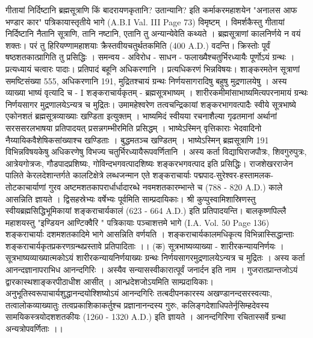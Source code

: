 गीतायां निर्दिष्टानि ब्रह्मसूत्राणि किं बादरायणकृतानि? उतान्यानि? इति कर्माकरमहाशयेन "अनालस आफ भण्डार कार" पत्रिकायास्तृतीये भागे (A.B.I Val. III Page 73) विमृष्टम् । विमर्शकैस्तु गीतायां निर्दिष्टानि नैतानि सूत्राणि, तानि नष्टानि, एतानि तु अन्यान्येवेति कथ्यते । ब्रह्मसूत्राणां कालनिर्णये न वयं शक्तः। परं तु हिरियण्णामहाशयाः क्रैस्तवीयचतुर्थतकमिति (400 A.D.) वदन्ति। क्रिस्तोः पूर्वं षष्ठशतकात्प्रागिति तु प्रसिद्धिः । 
समन्वय - अविरोध - साधन - फलाख्यैश्चतुर्भिरध्यायैः पूर्णोऽयं ग्रन्थः । प्रत्यध्यायं चत्वारः पादाः। प्रतिपादं बहूनि अधिकरणानि । प्रत्यधिकरणं भिन्नविषयः। शाङ्करमतेन सूत्राणां समष्टिसंख्या 555, अधिकरणानि 191, मुद्रितश्चायं ग्रन्थः निर्णयसागरादिषु बहुषु मुद्रणालयेषु । अस्य व्याख्या भाष्यं वृत्यादि च -  
I शङ्कराचार्यकृतम् - ब्रह्मसूत्रभाष्यम् । 
शारीरकमीमांसाभाष्यमित्यपरनामायं ग्रन्थः निर्णयसागर मुद्रणालयेऽन्यत्र च मुद्रितः। उमामहेश्वरेण तत्वचन्द्रिकायां शङ्करभागवत्पादैः स्वीये सूत्रभाष्ये एकोनशतं ब्रह्मसूत्रव्याख्याः खण्डिता इत्युक्तम् । भाष्यमिदं स्वीयया रचनाशैल्या गृढतमानां अर्थानां सरससरलभाषया प्रतिपादयत् प्रसन्नगम्भीरमिति प्रसिद्धम् । भाष्येऽस्मिन् वृत्तिकाराः भेदवादिनो नैय्यायिकवैशेषिकसांख्याश्च खण्डिताः । बुद्धमतञ्च खण्डितम् । भाष्येऽस्मिन् ब्रह्मसूत्राणि  191 विभिन्नविषयकेषु अधिकरणेषु विभज्य चतुर्भिरध्यायैरूपवर्णितानि । 
अस्य कर्ता विद्याघिराजपौत्रः, शिवगुरुपुत्रः, आत्रेयगोत्रजः, गौडपादप्रशिष्यः, गोविन्दभगवत्पादशिष्यः शङ्करभगवत्पाद इति प्रसिद्धिः। राजशेखरराजेन पालिते केरलदेशान्तर्गते कालटिक्षेत्रे लब्धजन्मान एते शङ्कराचार्याः पद्मपाद-सुरेश्वर-हस्तामलक-तोटकाचार्याणां गुरव अष्टमशतकापरार्धार्धादारब्धे नवमशतकारम्भान्ते च (788 - 820 A.D.) काले आसन्निति ज्ञायते । द्विसहस्रेभ्यः वर्षेभ्यः पूर्वमिति साम्प्रदायिकाः। श्री कुप्पुस्वामिशास्रिणस्तु स्वीयब्रह्मसिद्धिभूमिकायां शङ्कराचार्यकालं  (623 - 664 A.D.) इति प्रतिपादयन्ति। बालकृष्णपिल्लै महाशयस्तु  "इण्डियन आण्टिक्वैरि " पत्रिकायाः पञ्चाशत्तमे भागे (I.A. Vol. 50 Page 136) शङ्कराचार्याः दशमशतकादिमे भागे आसन्निति वर्णयति । शङ्कराचार्यकालमधिकृत्य विभिन्नास्सिद्धान्ताः शङ्कराचार्यकृतप्रकरणग्रन्थप्रस्तावे प्रतिपादिताः ।। 
(क) सूत्रभाष्यव्याख्या - शारीरकन्यायनिर्णयः । 
सूत्रभाष्यव्याख्यात्मकोऽयं शारीरकन्यायनिर्णयाख्यः ग्रन्थः निर्णयसागरमुद्रणालयेऽन्यत्र च मुद्रितः । अस्य कर्ता आनन्दज्ञानापराभिध आनन्दगिरिः । अस्यैव सन्यासस्वीकारात्पूर्वं जनार्दन इति नाम । गुजरातप्रान्तजोऽयं द्वारकास्थशाङ्करपीठाधीश आसीत् । आन्ध्रदेशजोऽयमिति साम्प्रदायिकाः। अनुभूतिस्वरूपाचार्यशुद्धानन्दयोश्शिष्योऽयं आनन्दगिरिः तत्बदीपनकारस्य अखण्डानन्दसरस्वत्याः, तत्वालोकव्याख्यातुः तत्वप्रकाशिकाकर्तुश्च प्रज्ञानानन्दस्य गुरुः, कलिङ्गदेशाधिपतेर्नृसिम्हदेवस्य सामयिकस्त्रयोदशशतकीयः (1260 - 1320 A.D.) इति ज्ञायते । आनन्दगिरिणा रचितास्सर्वे ग्रन्था अन्यत्रोपवर्णिताः ।।
